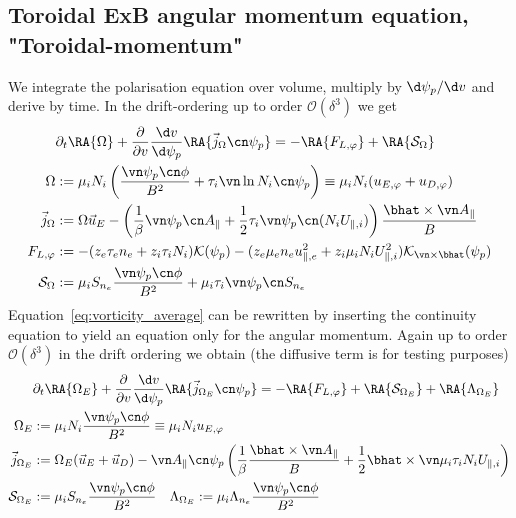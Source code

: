 \subsection{Toroidal ExB angular momentum equation, "Toroidal-momentum"} \label{sec:vorticity_eq}
We integrate the polarisation equation over volume, multiply by $\d \psi_p/\d v$ and derive by time. In the drift-ordering up to order $\mathcal O(\delta^3)$ we get
\begin{align}
    &\partial_t \RA{\Omega} + \frac{\partial}{\partial v}\frac{\d v}{\d\psi_p}\RA{\vec j_\Omega\cn\psi_p} = -\RA{F_{L,\varphi}} + \RA{\mathcal S_\Omega} \label{eq:vorticity_average} \\
\Omega &:= \mu_i N_i \left(\frac{\vn\psi_p\cn\phi}{B^2} + \tau_i \vn\ln N_i\cn\psi_p\right) \equiv \mu_i N_i(u_{E,\varphi} + u_{D,\varphi}) \\
\vec j_{\Omega} &:= \Omega \vec u_E
    - \left(\frac{1}{\beta} \vn\psi_p \cn A_\parallel +\frac{1}{2}\tau_i \vn\psi_p\cn  (N_iU_{\parallel,i})\right)\frac{\bhat\times\vn A_\parallel}{B} \\
    F_{L,\varphi} &:=  -(z_e \tau_e n_e + z_i\tau_i N_i)\mathcal K(\psi_p) - (z_e\mu_e n_eu_{\parallel,e}^2 + z_i\mu_i N_iU_{\parallel,i}^2)\mathcal K_{\vn\times\bhat}(\psi_p) \\
    \mathcal S_\Omega &:= \mu_i S_{n_e} \frac{\vn\psi_p\cn \phi}{B^2} + \mu_i\tau_i\vn\psi_p\cn S_{n_e} \label{eq:em_source}
\end{align}
Equation~\eqref{eq:vorticity_average} can be rewritten by inserting the continuity equation to yield an equation only for the \ExB angular momentum. Again up to order $\mathcal O(\delta^3)$ in the drift ordering we obtain
(the diffusive term is for testing purposes)
\begin{align}
&\partial_t \RA{\Omega_E} + \frac{\partial}{\partial v} \frac{\d v}{\d \psi_p}\RA{ \vec j_{\Omega_E}\cn\psi_p} = -\RA{F_{L,\varphi}}+ \RA{\mathcal S_{\Omega_E}} + \RA{\Lambda_{\Omega_E}} \label{eq:exb_average} \\
\Omega_E &:= \mu_i N_i \frac{\vn\psi_p\cn\phi}{B^2} \equiv \mu_i N_i u_{E,\varphi} \\
\vec j_{\Omega_E} &:= \Omega_E (\vec u_E + \vec u_D)
    - \vn A_\parallel\cn\psi_p \left(\frac{1}{\beta} \frac{\bhat\times\vn A_\parallel}{B} +\frac{1}{2} \bhat \times \vn \mu_i \tau_i N_iU_{\parallel,i}\right) \\
    \mathcal S_{\Omega_E} &:= \mu_i S_{n_e} \frac{\vn\psi_p\cn\phi}{B^2} \quad
    \Lambda_{\Omega_E} := \mu_i \Lambda_{n_e}\frac{\vn\psi_p\cn\phi}{B^2}
\end{align}
